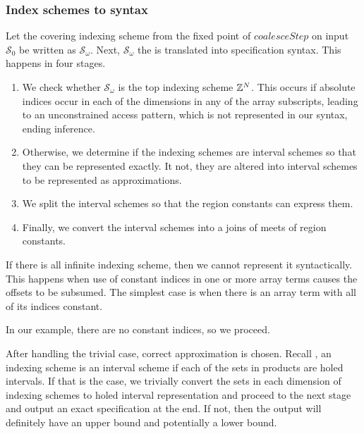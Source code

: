 \subsubsection{Index schemes to syntax}

\newcommand{\finalSet}{\mathcal{S}_\omega}
Let the covering indexing scheme from the fixed point of
$\mathit{coalesceStep}$ on input $\mathcal{S}_0$ be written as
$\finalSet{}$.  Next, $\finalSet{}$ the is translated into specification
syntax. This happens in four stages.

\begin{enumerate}[leftmargin=1.5em]
  \item We check whether $\finalSet{}$
  is the top indexing scheme $\textnormal{$\mathbb{Z}$}{}^N$. This occurs if absolute indices
  occur in each of the dimensions in any of the array subscripts,
  leading to an unconstrained access pattern, which is not represented
  in our syntax, ending inference.

  \item Otherwise, we determine if the indexing schemes are interval
  schemes so that they can be represented exactly. It not, they are
  altered into interval schemes to be represented as approximations.

  \item We split the interval schemes so that the region constants can
  express them.

  \item Finally, we convert the interval schemes into a joins of meets
  of region constants.
\end{enumerate}

If there is all infinite indexing scheme, then we cannot represent it
syntactically. This happens when use of constant indices in one or more array
terms causes the offsets to be subsumed. The simplest case is when there is an
array term with all of its indices constant.

In our example, there are no constant indices, so we proceed.

After handling the trivial case, correct approximation is chosen. Recall
, an indexing scheme is an interval scheme if each of
the sets in products are holed intervals. If that is the case, we trivially
convert the sets in each dimension of indexing schemes to holed interval
representation and proceed to the next stage and output an exact specification
at the end. If not, then the output will definitely have an upper bound and
potentially a lower bound.

